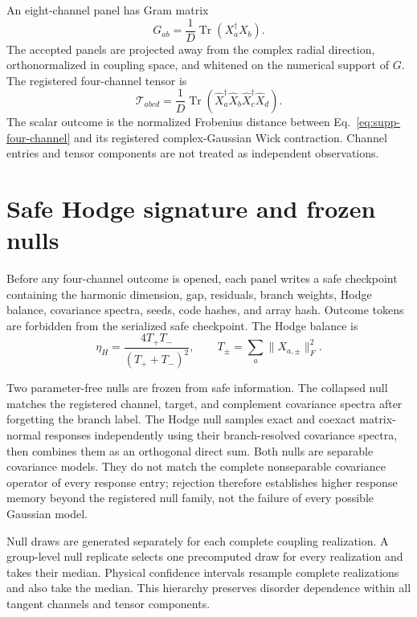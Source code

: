 \documentclass[aps,prl,onecolumn,superscriptaddress,longbibliography,floatfix]{revtex4-2}
\newcommand{\Tr}{\operatorname{Tr}}
\begin{document}
An eight-channel panel has Gram matrix
\begin{equation}
 G_{ab}=\frac{1}{D}\Tr(X_a^\dagger X_b).
 \label{eq:supp-gram}
\end{equation}
The accepted panels are projected away from the complex radial direction, orthonormalized in coupling space, and whitened on the numerical support of \(G\). The registered four-channel tensor is
\begin{equation}
 \mathcal T_{abcd}=\frac{1}{D}\Tr\!\left(
 \widehat X_a^\dagger\widehat X_b
 \widehat X_c^\dagger\widehat X_d\right).
 \label{eq:supp-four-channel}
\end{equation}
The scalar outcome is the normalized Frobenius distance between Eq.~\eqref{eq:supp-four-channel} and its registered complex-Gaussian Wick contraction. Channel entries and tensor components are not treated as independent observations.

\section{Safe Hodge signature and frozen nulls}
\label{sec:supp-nulls}

Before any four-channel outcome is opened, each panel writes a safe checkpoint containing the harmonic dimension, gap, residuals, branch weights, Hodge balance, covariance spectra, seeds, code hashes, and array hash. Outcome tokens are forbidden from the serialized safe checkpoint. The Hodge balance is
\begin{equation}
 \eta_H=\frac{4T_+T_-}{(T_++T_-)^2},\qquad
 T_\pm=\sum_a\lVert X_{a,\pm}\rVert_F^2.
 \label{eq:supp-balance}
\end{equation}

Two parameter-free nulls are frozen from safe information. The collapsed null matches the registered channel, target, and complement covariance spectra after forgetting the branch label. The Hodge null samples exact and coexact matrix-normal responses independently using their branch-resolved covariance spectra, then combines them as an orthogonal direct sum. Both nulls are separable covariance models. They do not match the complete nonseparable covariance operator of every response entry; rejection therefore establishes higher response memory beyond the registered null family, not the failure of every possible Gaussian model.

Null draws are generated separately for each complete coupling realization. A group-level null replicate selects one precomputed draw for every realization and takes their median. Physical confidence intervals resample complete realizations and also take the median. This hierarchy preserves disorder dependence within all tangent channels and tensor components.
\end{document}
